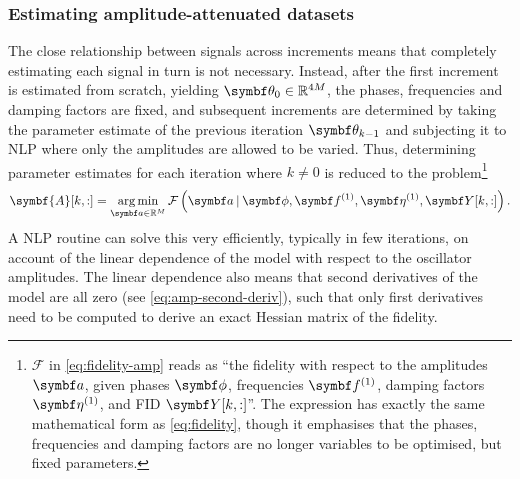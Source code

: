 \subsubsection{Estimating amplitude-attenuated datasets}
The close relationship between signals across increments means that completely
estimating each signal in turn is not necessary. Instead, after the first
increment is estimated from scratch, yielding $\bth_0 \in \mathbb{R}^{4M}$,
the phases, frequencies and damping factors are fixed, and subsequent
increments are determined by taking the parameter estimate of the previous
iteration $\bth_{k-1}$ and subjecting it to \ac{NLP} where only the amplitudes
are allowed to be varied.  Thus, determining parameter estimates for each
iteration where $k \neq 0$ is reduced to the problem\footnote{
    $\mathcal{F}$ in \eqref{eq:fidelity-amp} reads as ``the fidelity
    with respect to the amplitudes $\bda$, given phases $\bdphi$,
    frequencies $\bdfone$, damping factors  $\bdetaone$, and \ac{FID}
    $\bY[k,:]$''. The expression has exactly the same mathematical form as
    \eqref{eq:fidelity}, though it emphasises that the phases, frequencies and
    damping factors are no longer variables to be optimised, but fixed
    parameters.
}
\begin{equation}
    \symbf{A}[k,:] = \argmin_{\bda \in \mathbb{R}^M}
        \mathcal{F}\left(\bda \hspace*{2pt} | \hspace*{2pt}
        \bdphi, \bdfone, \bdetaone, \bY[k,:]\right).
        \label{eq:fidelity-amp}
\end{equation}
A \ac{NLP} routine can solve this very efficiently, typically in few
iterations, on account of the linear dependence of the model with respect to
the oscillator amplitudes. The linear dependence also means that second
derivatives of the model are all zero (see \eqref{eq:amp-second-deriv}),
such that only first derivatives need to be computed to derive an exact Hessian
matrix of the fidelity.

